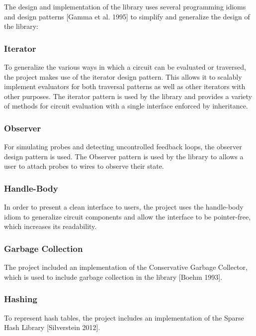 \documentclass{article}
\begin{document}
The design and implementation of the library uses several programming idioms and design patterns [Gamma et al. 1995] to simplify and generalize the design of the library:

\subsubsection{Iterator}

To generalize the various ways in which a circuit can be evaluated or traversed, the project makes use of the iterator design pattern. This allows it to scalably implement evaluators for both traversal patterns as well as other iterators with other purposes. The iterator pattern is used by the library and provides a variety of methods for circuit evaluation with a single interface enforced by inheritance.

\subsubsection{Observer}

For simulating probes and detecting uncontrolled feedback loops, the observer design pattern is used. The Observer pattern is used by the library to allows a user to attach probes to wires to observe their state.

\subsubsection{Handle-Body}

In order to present a clean interface to users, the project uses the handle-body idiom to generalize circuit components and allow the interface to be pointer-free, which increases its readability.

\subsubsection{Garbage Collection}

The project included an implementation of the Conservative Garbage Collector, which is used to include garbage collection in the library [Boehm 1993].

\subsubsection{Hashing}

To represent hash tables, the project includes an implementation of the Sparse Hash Library [Silverstein 2012].
\end{document}
